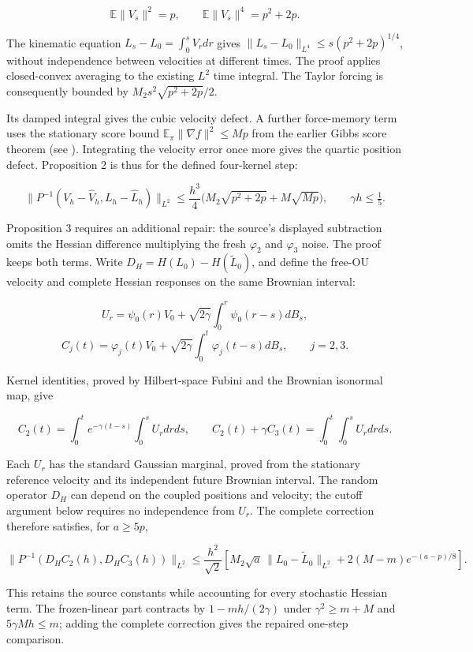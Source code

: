 \documentclass[11pt,a4paper]{article}
\begin{document}
\[\mathbb E\|V_s\|^2=p,\qquad
\mathbb E\|V_s\|^4=p^2+2p.\]


The kinematic equation \(L_s-L_0=\int_0^sV_rdr\) gives
\(\|L_s-L_0\|_{L^4}\le s(p^2+2p)^{1/4}\), without independence
between velocities at different times. The proof applies closed-convex
averaging to the existing \(L^2\) time integral. The Taylor forcing
is consequently bounded by \(M_2s^2\sqrt{p^2+2p}/2\).




Its damped integral gives the cubic velocity defect. A further force-memory
term uses the stationary score bound
\(\mathbb E_\pi\|\nabla f\|^2\le Mp\) from the earlier Gibbs score theorem (see \cite[Section~3.27.8]{LangevinLean2026ULASC}). Integrating the velocity error
once more gives the quartic position defect. Proposition 2 is thus for the defined four-kernel step:


\[\|P^{-1}(V_h-\hat V_h,L_h-\hat L_h)\|_{L^2}
\le\frac{h^3}{4}\bigl(M_2\sqrt{p^2+2p}+M\sqrt{Mp}\bigr),
\qquad \gamma h\le\tfrac15.\]


Proposition 3 requires an additional repair: the source's displayed
subtraction omits the Hessian difference multiplying the fresh
\(\varphi_2\) and \(\varphi_3\) noise. The proof keeps both terms.
Write \(D_H=H(L_0)-H(\widetilde L_0)\), and define the free-OU velocity
and complete Hessian responses on the same Brownian interval:


\[U_r=\psi_0(r)V_0+\sqrt{2\gamma}\int_0^r\psi_0(r-s)dB_s,\]
\[C_j(t)=\varphi_j(t)V_0+\sqrt{2\gamma}
\int_0^t\varphi_j(t-s)dB_s,\qquad j=2,3.\]


Kernel identities, proved by Hilbert-space Fubini and the Brownian
isonormal map, give


\[C_2(t)=\int_0^te^{-\gamma(t-s)}\int_0^sU_rdrds,
\qquad C_2(t)+\gamma C_3(t)=\int_0^t\int_0^sU_rdrds.\]


Each \(U_r\) has the standard Gaussian marginal, proved from the stationary reference velocity and its independent future Brownian interval.
The random operator \(D_H\) can depend on the coupled positions and velocity;
the cutoff argument below requires no independence from \(U_r\). The complete
correction therefore satisfies, for \(a\ge5p\),


\[\|P^{-1}(D_HC_2(h),D_HC_3(h))\|_{L^2}
\le\frac{h^2}{\sqrt2}\left[
M_2\sqrt a\,\|L_0-\widetilde L_0\|_{L^2}
+2(M-m)e^{-(a-p)/8}\right].\]


This retains the source constants while accounting for every stochastic
Hessian term. The frozen-linear part contracts by \(1-mh/(2\gamma)\)
under \(\gamma^2\ge m+M\) and \(5\gamma Mh\le m\); adding the complete
correction gives the repaired one-step comparison.
\end{document}
